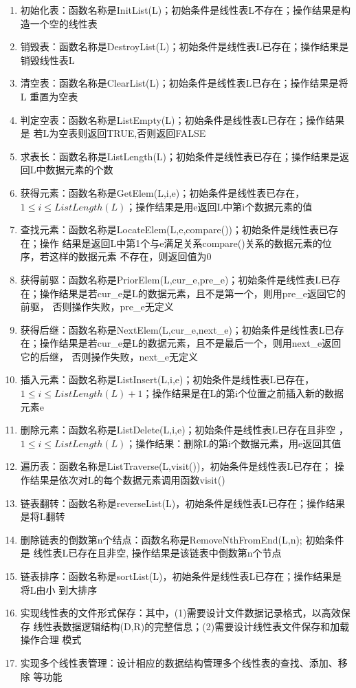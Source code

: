 \documentclass[supercite]{Experimental_Report}
\theoremstyle{definition}
\begin{document}
	\begin{enumerate}
		\label{tasklist:1}
		\item 初始化表：函数名称是InitList(L)；初始条件是线性表L不存在；操作结果是构
		造一个空的线性表
		\item 销毁表：函数名称是DestroyList(L)；初始条件是线性表L已存在；操作结果是
		销毁线性表L
		\item 清空表：函数名称是ClearList(L)；初始条件是线性表L已存在；操作结果是将L
		重置为空表
		\item 判定空表：函数名称是ListEmpty(L)；初始条件是线性表L已存在；操作结果是
		若L为空表则返回TRUE,否则返回FALSE
		\item 求表长：函数名称是ListLength(L)；初始条件是线性表已存在；操作结果是返
		回L中数据元素的个数
		\item 获得元素：函数名称是GetElem(L,i,e)；初始条件是线性表已存在，
		$1\leq i\leq ListLength(L)$；操作结果是用e返回L中第i个数据元素的值
		\item 
		查找元素：函数名称是LocateElem(L,e,compare())；初始条件是线性表已存在；操作
		结果是返回L中第1个与e满足关系compare()关系的数据元素的位序，若这样的数据元素
		不存在，则返回值为0
		\item 获得前驱：函数名称是PriorElem(L,cur\_e,pre\_e)；初始条件是线性表L已存
		在；操作结果是若cur\_e是L的数据元素，且不是第一个，则用pre\_e返回它的前驱，
		否则操作失败，pre\_e无定义
		\item 获得后继：函数名称是NextElem(L,cur\_e,next\_e)；初始条件是线性表L已存
		在；操作结果是若cur\_e是L的数据元素，且不是最后一个，则用next\_e返回它的后继，
		否则操作失败，next\_e无定义
		\item 
		插入元素：函数名称是ListInsert(L,i,e)；初始条件是线性表L已存在，
		$1\leq i\leq 
		ListLength(L)+1$；操作结果是在L的第i个位置之前插入新的数据元素e
		\item 删除元素：函数名称是ListDelete(L,i,e)；初始条件是线性表L已存在且非空
		，$1\leq i\leq ListLength(L)$；操作结果：删除L的第i个数据元素，用e返回其值
		\item 遍历表：函数名称是ListTraverse(L,visit())，初始条件是线性表L已存在；
		操作结果是依次对L的每个数据元素调用函数visit()
		\item 链表翻转：函数名称是reverseList(L)，初始条件是线性表L已存在；操作结果
		是将L翻转
		\item 删除链表的倒数第n个结点：函数名称是RemoveNthFromEnd(L,n); 初始条件是
		线性表L已存在且非空, 操作结果是该链表中倒数第n个节点
		\item 
		链表排序：函数名称是sortList(L)，初始条件是线性表L已存在；操作结果是将L由小
		到大排序
		\item 实现线性表的文件形式保存：其中，(1)需要设计文件数据记录格式，以高效保存
		线性表数据逻辑结构(D,{R})的完整信息；(2)需要设计线性表文件保存和加载操作合理
		模式
		\item 实现多个线性表管理：设计相应的数据结构管理多个线性表的查找、添加、移除
		等功能
		
	\end{enumerate}
\end{document}
